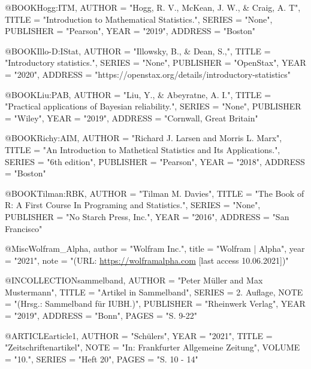



@BOOK{Hogg:ITM,
  AUTHOR       = "Hogg, R. V., McKean, J. W., & Craig, A. T",
  TITLE        = "{Introduction to Mathematical Statistics.}",
  SERIES       = {"None"},
  PUBLISHER    = "Pearson",
  YEAR         = "2019",
  ADDRESS      = "Boston"
}

@BOOK{Illo-D:IStat,
  AUTHOR       = "Illowsky, B., & Dean, S.,",
  TITLE        = "{Introductory statistics.}",
  SERIES       = {"None"},
  PUBLISHER    = "OpenStax",
  YEAR         = "2020",
  ADDRESS      = "https://openstax.org/details/introductory-statistics"
}

@BOOK{Liu:PAB,
  AUTHOR       = "Liu, Y., & Abeyratne, A. I.",
  TITLE        = "{Practical applications of Bayesian reliability.}",
  SERIES       = {"None"},
  PUBLISHER    = "Wiley",
  YEAR         = "2019",
  ADDRESS      = "Cornwall, Great Britain"
}

@BOOK{Richy:AIM,
  AUTHOR       = "Richard J. Larsen and Morris L. Marx",
  TITLE        = "{An Introduction to Mathetical Statistics and Its Applications.}",
  SERIES       = "{6th edition}",
  PUBLISHER    = "Pearson",
  YEAR         = "2018",
  ADDRESS      = "Boston"
}


@BOOK{Tilman:RBK,
  AUTHOR       = "Tilman M. Davies",
  TITLE        = "{The Book of R: A First Course In Programing and Statistics.}",
  SERIES       = {"None"},
  PUBLISHER    = "No Starch Press, Inc.",
  YEAR         = "2016",
  ADDRESS      = "San Francisco"
}


@Misc{Wolfram_Alpha,
  author = "{Wolfram Inc.}",
  title = "{Wolfram | Alpha}",
  year = "2021",
  note = "(URL: \url{https://wolframalpha.com} [last access 10.06.2021])"
  }

@INCOLLECTION{sammelband,
  AUTHOR       = "Peter Müller and Max Mustermann",
  TITLE        = "{Artikel in Sammelband}",
  SERIES       = {2. Auflage},
  NOTE         = "{(Hrsg.: Sammelband für IUBH.)}",
  PUBLISHER    = "Rheinwerk Verlag",
  YEAR         = "2019",
  ADDRESS      = "Bonn",
  PAGES        = "{S. 9-22}"
}

@ARTICLE{article1,
  AUTHOR       = "Schülers",
  YEAR         = "2021",
  TITLE        = "{Zeitschriftenartikel}",
  NOTE         = "{In: Frankfurter Allgemeine Zeitung}",
  VOLUME       = "10.",
  SERIES       = "{Heft 20}",
  PAGES        = "{S. 10 - 14}"
}


